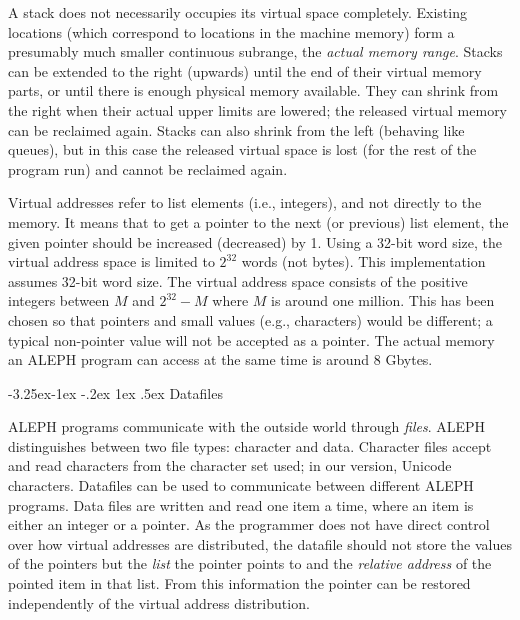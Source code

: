 \documentclass{article}
\makeatletter
\newcommand\A{{\sf ALEPH}}
\newcommand\g[1]{{\sf #1}}
\renewcommand\subsection{%
\@startsection{subsection}{2}{\z@}%
   {-3.25ex\@plus -1ex \@minus -.2ex}%
   {1ex \@plus .5ex}%
   {\normalfont\normalsize\bfseries}}
\makeatother
\begin{document}
A \g{stack} does not necessarily occupies its virtual space
completely.
Existing locations (which correspond to locations in the machine memory)
form a presumably much smaller continuous subrange, the \emph{actual memory
range}. \g{Stack}s can be extended to the right (upwards) until the end of
their virtual memory parts, or until there is enough physical memory available.
They can shrink from the right when their actual upper limits are lowered; the
released virtual memory can be reclaimed again. \g{Stack}s can also shrink
from the left (behaving like queues), but in this case the released virtual
space is lost (for the rest of the program run) and cannot be reclaimed
again.

Virtual addresses refer to list elements (i.e., integers), and not directly
to the memory. It means that to get a pointer to the next (or previous) list element,
the given pointer should be increased (decreased) by 1. Using
a 32-bit word size, the virtual address space is limited to $2^{32}$ words
(not bytes). This implementation assumes 32-bit word size. The
virtual address space consists of the positive integers between $M$ and
$2^{32}-M$ where $M$ is around one million. This has been chosen so that
pointers and small values (e.g., characters) would be different; a typical
non-pointer value will not be accepted as a pointer. The actual memory an
\A{} program can access at the same time is around 8 Gbytes.

\subsection{Datafiles}\label{subsec:datafile}

\A{} programs communicate with the outside world through \emph{files}. \A{}
distinguishes between two file types: character and data. Character files
accept and read characters from the character set used; in our version,
Unicode characters. Datafiles can be used to communicate between different
\A{} programs. Data files are written and read one item a time, where an
item is either an integer or a pointer. As the programmer does not have
direct control over how virtual addresses are distributed, the datafile
should not store the values of the pointers but the \emph{list} the pointer
points to and the \emph{relative address} of the pointed item in that list.
From this information the pointer can be restored independently of the
virtual address distribution.
\end{document}
